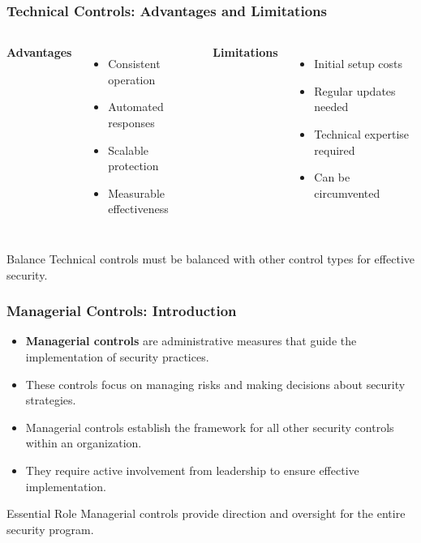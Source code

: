\documentclass{beamer}
\begin{document}
\begin{frame}
    \frametitle{Technical Controls: Advantages and Limitations}
    
    \begin{columns}[t]
        \textbf{Advantages}
        \begin{itemize}
            \item Consistent operation
            \item Automated responses
            \item Scalable protection
            \item Measurable effectiveness
        \end{itemize}
        
        \textbf{Limitations}
        \begin{itemize}
            \item Initial setup costs
            \item Regular updates needed
            \item Technical expertise required
            \item Can be circumvented
        \end{itemize}
    \end{columns}
    
    \begin{block}{Balance}
        Technical controls must be balanced with other control types for effective security.
    \end{block}
\end{frame}

\begin{frame}
    \frametitle{Managerial Controls: Introduction}
    
    \begin{itemize}
        \item \textbf{Managerial controls} are administrative measures that guide the implementation of security practices.
        
        \item These controls focus on managing risks and making decisions about security strategies.
        
        \item Managerial controls establish the framework for all other security controls within an organization.
        
        \item They require active involvement from leadership to ensure effective implementation.
    \end{itemize}
    
    \begin{block}{Essential Role}
        Managerial controls provide direction and oversight for the entire security program.
    \end{block}
\end{frame}
\end{document}
